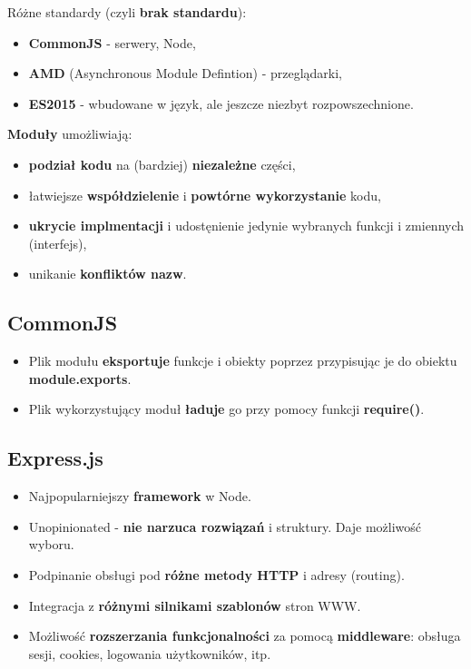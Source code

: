 \documentclass[../main.tex]{subfiles}
\begin{document}
    Różne standardy (czyli \textbf{brak standardu}):
    \begin{itemize}
        \item \textbf{CommonJS} - serwery, Node,
        \item \textbf{AMD} (Asynchronous Module Defintion) - przeglądarki,
        \item \textbf{ES2015} - wbudowane w język, ale jeszcze niezbyt rozpowszechnione.
    \end{itemize}

    \textbf{Moduły} umożliwiają:
    \begin{itemize}
        \item \textbf{podział kodu} na (bardziej) \textbf{niezależne} części,
        \item łatwiejsze \textbf{współdzielenie} i \textbf{powtórne wykorzystanie} kodu,
        \item \textbf{ukrycie implmentacji} i udostęnienie jedynie wybranych funkcji i zmiennych (interfejs),
        \item unikanie \textbf{konfliktów nazw}.
    \end{itemize}

    \subsection{CommonJS}
    \begin{itemize}
        \item Plik modułu \textbf{eksportuje} funkcje i obiekty poprzez przypisując je do obiektu \textbf{module.exports}.
        \item Plik wykorzystujący moduł \textbf{ładuje} go przy pomocy funkcji \textbf{require()}.
    \end{itemize}

    \subsection{Express.js}
    \begin{itemize}
        \item Najpopularniejszy \textbf{framework} w Node.
        \item Unopinionated - \textbf{nie narzuca rozwiązań} i struktury. Daje możliwość wyboru.
        \item Podpinanie obsługi pod \textbf{różne metody HTTP} i adresy (routing).
        \item Integracja z \textbf{różnymi silnikami szablonów} stron WWW.
        \item Możliwość \textbf{rozszerzania funkcjonalności} za pomocą \textbf{middleware}: obsługa sesji, cookies, logowania użytkowników, itp.
    \end{itemize}
\end{document}
